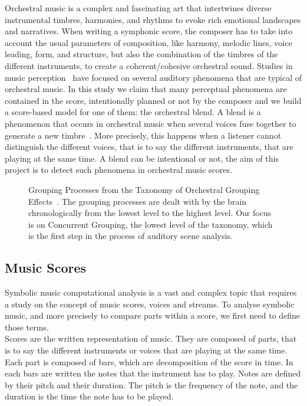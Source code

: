 \documentclass{article}
\newcommand{\fm}[1]{\textcolor{magenta}{FM: << #1 >>}}
\begin{document}
Orchestral music is a complex and fascinating art that intertwines diverse instrumental timbres, harmonies, and rhythms to evoke rich emotional landscapes and narratives.
When writing a symphonic score, the composer has to take into account the usual parameters of composition, like harmony, melodic lines, voice leading, form, and structure, but also the combination of the timbres of the different instruments, to create a coherent/cohesive orchestral sound.
Studies in music perception~\cite{mcadams_taxonomy_2022, spectral_centroid, spectral_envelope_Lembke} have focused on several auditory phenomena that are typical of orchestral music.
In this study we claim that many perceptual phenomena are contained in the score, intentionally planned or not by the composer and we build a score-based model for one of them: the orchestral blend.
A blend is a phenomenon that occurs in orchestral music when several voices fuse together to generate a new timbre~\cite{mcadams_taxonomy_2022,bernier-robert_blend_nodate}.
More precisely, this happens when a listener cannot distinguish the different voices, that is to say the different instruments, that are playing at the same time.
A blend can be intentional or not, the aim of this project is to detect such phenomena in orchestral music scores.

\begin{figure}[ht]
  \centerline{}
  \caption{Grouping Processes from the Taxonomy of Orchestral Grouping Effects~\cite{mcadams_taxonomy_2022}.
  The grouping processes are dealt with by the brain chronologically from the lowest level to the highest level.
  Our focus is on Concurrent Grouping, the lowest level of the taxonomy, which is the first step in the process of auditory scene analysis.}
  \label{fig:grouping_processes}
 \end{figure}

\subsection{Music Scores}

Symbolic music computational analysis is a vast and complex topic that requires a study on the concept of music scores, voices and streams.
To analyse symbolic music, and more precisely to compare parts within a score, we first need to define those terms.\\
%
Scores are the written representation of music. They are composed of parts, that is to say the different instruments or voices that are playing at the same time.
Each part is composed of bars, which are decomposition of the score in time. In each bars are written the notes that the instrument has to play.
Notes are defined by their pitch and their duration. The pitch is the frequency of the note, and the duration is the time the note has to be played.
\end{document}
